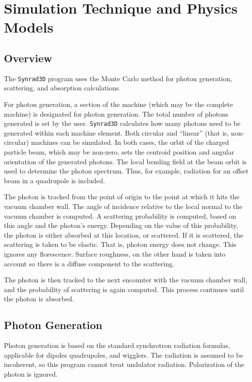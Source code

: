 \documentclass[11pt,openany]{report}
\newcommand{\srthree}{\texttt{Synrad3D}\xspace}
\begin{document}
\chapter{Simulation Technique and Physics Models}
\section{Overview} 

The \srthree program uses the Monte Carlo method for photon
generation, scattering, and absorption calculations.

For photon generation, a section of the machine (which may be the
complete machine) is designated for photon generation.  The total
number of photons generated is set by the user. \srthree calculates
how many photons need to be generated within each machine
element. Both circular and ``linear'' (that is, non-circular) machines
can be simulated.  In both cases, the orbit of the charged particle
beam, which may be non-zero, sets the centroid position and angular
orientation of the generated photons. The local bending field at the
beam orbit is used to determine the photon spectrum. Thus, for
example, radiation for an offset beam in a quadrupole is included.

The photon is tracked from the point of origin to
the point at which it hits the vacuum chamber wall. The angle of
incidence relative to the local normal to the vacuum chamber is
computed. A scattering probability is computed, based on this angle
and the photon's energy. Depending on the value of this probability,
the photon is either absorbed at this location, or scattered. If it is
scattered, the scattering is taken to be elastic. That is, photon
energy does not change. This ignores any florescence. Surface
roughness, on the other hand is taken into account so there is a
diffuse component to the scattering.

The photon is then tracked to the next encounter with the vacuum
chamber wall, and the probability of scattering is again
computed. This process continues until the photon is absorbed.

\section{Photon Generation}

Photon generation is based on the standard synchrotron radiation
formulas, applicable for dipoles quadrupoles, and wigglers. The
radiation is assumed to be incoherent, so this program cannot treat
undulator radiation. Polarization of the photon is ignored.
\end{document}
